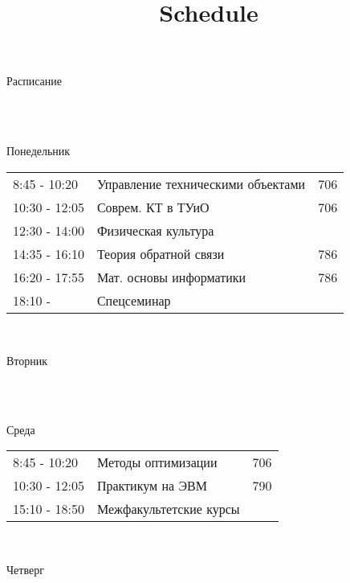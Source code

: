 \documentclass[12pt,a4paper]{article}
\title{Schedule}
\begin{document}
\begin{Huge} Расписание  \end{Huge}   \\ \\
    {\begin{Large} Понедельник  \end{Large}  
        \begin{table}[!h]
        \begin{tabular}{ p{3cm}  p{10cm} p{5cm} }  
            8:45 - 10:20 & Управление техническими объектами & 706\\
            10:30 - 12:05 & Соврем. КТ в ТУиО & 706\\
            12:30 - 14:00 & Физическая культура & \\
            14:35 - 16:10 & Теория обратной связи & 786\\
            16:20 - 17:55 & Мат. основы информатики & 786\\
            18:10 -  & Спецсеминар & \\
        \end{tabular}
        \end{table} \\
    {\begin{Large} Вторник  \end{Large}  
        \begin{table}[!h]
        \begin{tabular}{ p{3cm}  p{10cm} p{5cm} }  
        \end{tabular}
        \end{table} \\
    {\begin{Large} Среда  \end{Large}  
        \begin{table}[!h]
        \begin{tabular}{ p{3cm}  p{10cm} p{5cm} }  
            8:45 - 10:20 & Методы оптимизации & 706\\
            10:30 - 12:05 & Практикум на ЭВМ & 790\\
            15:10 - 18:50 & Межфакультетские курсы & \\
        \end{tabular}
        \end{table} \\
    {\begin{Large} Четверг  \end{Large}  
        \begin{table}[!h]

\end{table}}}}}
\end{document}
